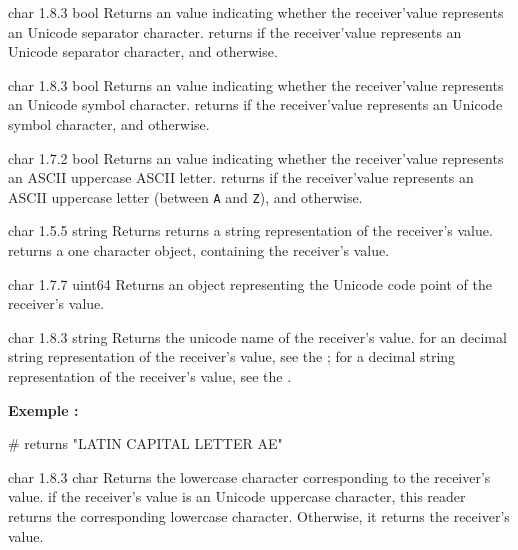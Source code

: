 {char}
{1.8.3}
{bool}
{Returns an  value indicating whether the receiver'value represents an Unicode separator character.}
{returns  if the receiver'value represents an Unicode separator character, and  otherwise.}






{char}
{1.8.3}
{bool}
{Returns an  value indicating whether the receiver'value represents an Unicode symbol character.}
{returns  if the receiver'value represents an Unicode symbol character, and  otherwise.}









{char}
{1.7.2}
{bool}
{Returns an  value indicating whether the receiver'value represents an ASCII uppercase ASCII letter.}
{returns  if the receiver'value represents an ASCII uppercase letter (between \texttt{\textquotesingle A\textquotesingle} and \texttt{\textquotesingle Z\textquotesingle}), and  otherwise.}





{char}
{1.5.5}
{string}
{Returns returns a string representation of the receiver's value.}
{returns a one character  object, containing the receiver's value.}




{char}
{1.7.7}
{uint64}
{Returns an  object representing the Unicode code point of the receiver's value.}
{}




{char}
{1.8.3}
{string}
{Returns the unicode name of the receiver's value.}
{for an decimal string representation of the receiver's value, see the ; for a decimal string representation of the receiver's value, see the .}

\textbf{Exemple :}
\begin{galgascode}
['\AE' unicodeName] # returns "LATIN CAPITAL LETTER AE"
\end{galgascode}




{char}
{1.8.3}
{char}
{Returns the lowercase character corresponding to the receiver's value.}
{if the receiver's value is an Unicode uppercase character, this reader returns the corresponding lowercase character. Otherwise, it returns the receiver's value.}

